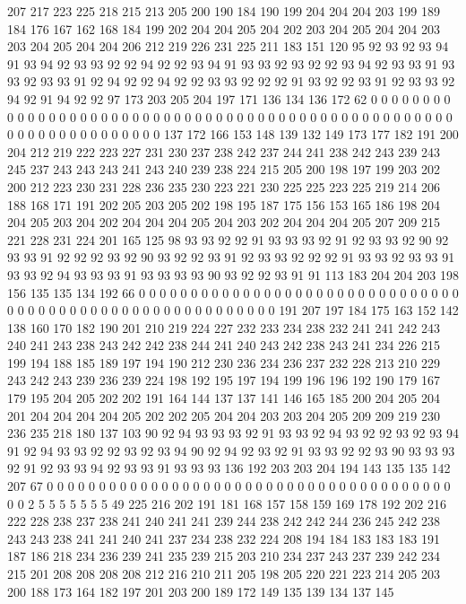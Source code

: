 207 217 223 225 218 215 213 205 200 190 184 190 199 204 204 204 203 199 189 184
176 167 162 168 184 199 202 204 204 205 204 202 203 204 205 204 204 203 203 204
205 204 204 206 212 219 226 231 225 211 183 151 120 95 92 93 92 93 94 91
93 94 92 93 93 92 92 94 92 92 93 94 91 93 93 92 93 92 92 93
94 92 93 93 91 93 93 92 93 93 91 92 94 92 92 94 92 92 93 93
92 92 92 91 93 92 92 93 91 92 93 93 92 94 92 91 94 92 92 97
173 203 205 204 197 171 136 134 136 172 62 0 0 0 0 0 0 0 0 0
0 0 0 0 0 0 0 0 0 0 0 0 0 0 0 0 0 0 0 0
0 0 0 0 0 0 0 0 0 0 0 0 0 0 0 0 0 0 0 0
0 0 0 0 0 0 0 0 0 0 0 0 0 0 0 0 0 137 172 166
153 148 139 132 149 173 177 182 191 200 204 212 219 222 223 227 231 230 237 238
242 237 244 241 238 242 243 239 243 245 237 243 243 243 241 243 240 239 238 224
215 205 200 198 197 199 203 202 200 212 223 230 231 228 236 235 230 223 221 230
225 225 223 225 219 214 206 188 168 171 191 202 205 203 205 202 198 195 187 175
156 153 165 186 198 204 204 205 203 204 202 204 204 204 205 204 203 202 204 204
204 205 207 209 215 221 228 231 224 201 165 125 98 93 93 92 92 91 93 93
93 92 91 92 93 93 92 90 92 93 93 91 92 92 92 93 92 90 93 92
92 93 91 92 93 93 92 92 92 91 93 93 92 93 93 91 93 93 92 94
93 93 93 91 93 93 93 93 90 93 92 92 93 91 91 113 183 204 204 203
198 156 135 135 134 192 66 0 0 0 0 0 0 0 0 0 0 0 0 0
0 0 0 0 0 0 0 0 0 0 0 0 0 0 0 0 0 0 0 0
0 0 0 0 0 0 0 0 0 0 0 0 0 0 0 0 0 0 0 0
0 0 0 0 191 207 197 184 175 163 152 142 138 160 170 182 190 201 210 219
224 227 232 233 234 238 232 241 241 242 243 240 241 243 238 243 242 242 238 244
241 240 243 242 238 243 241 234 226 215 199 194 188 185 189 197 194 190 212 230
236 234 236 237 232 228 213 210 229 243 242 243 239 236 239 224 198 192 195 197
194 199 196 196 192 190 179 167 179 195 204 205 202 202 191 164 144 137 137 141
146 165 185 200 204 205 204 201 204 204 204 204 205 202 202 205 204 204 203 203
204 205 209 209 219 230 236 235 218 180 137 103 90 92 94 93 93 93 92 91
93 93 92 94 93 92 92 93 92 93 94 91 92 94 93 93 92 92 93 92
93 94 90 92 94 92 93 92 91 93 93 92 92 93 90 93 93 93 92 91
92 93 93 94 92 93 93 91 93 93 93 136 192 203 203 204 194 143 135 135
142 207 67 0 0 0 0 0 0 0 0 0 0 0 0 0 0 0 0 0
0 0 0 0 0 0 0 0 0 0 0 0 0 0 0 0 0 0 0 0
0 0 0 0 2 5 5 5 5 5 5 5 49 225 216 202 191 181 168 157
158 159 169 178 192 202 216 222 228 238 237 238 241 240 241 241 239 244 238 242
242 244 236 245 242 238 243 243 238 241 241 240 241 237 234 238 232 224 208 194
184 183 183 183 191 187 186 218 234 236 239 241 235 239 215 203 210 234 237 243
237 239 242 234 215 201 208 208 208 208 212 216 210 211 205 198 205 220 221 223
214 205 203 200 188 173 164 182 197 201 203 200 189 172 149 135 139 134 137 145
